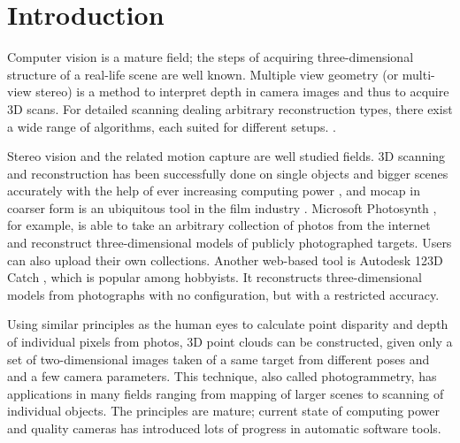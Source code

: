 \section{Introduction}
\thispagestyle{empty}

Computer vision is a mature field; the steps of acquiring three-dimensional structure of a real-life scene are well known.
Multiple view geometry (or multi-view stereo) is a method to interpret depth in camera images and thus to acquire 3D scans.
\cite{hartley03multiview,szeliski10vision,trucco1998introductory,heyden2005multiple}
For detailed scanning dealing arbitrary reconstruction types, there exist a wide range of algorithms, each suited for different setups.
\cite{seitz2006comparison}.

Stereo vision and the related motion capture are well studied fields.
3D scanning and reconstruction has been successfully done on single objects and bigger scenes accurately with the help of ever increasing computing power
\cite{goesele2007multi,furukawa2010towards,pollefeys1999hand},
and mocap in coarser form is an ubiquitous tool in the film industry \cite{moeslund2006survey}.
Microsoft Photosynth \cite{photosynth}, for example, is able to take an arbitrary collection of photos from the internet and reconstruct three-dimensional models of publicly photographed targets. Users can also upload their own collections.
Another web-based tool is Autodesk 123D Catch \cite{autodeskcatch}, which is popular among hobbyists. It reconstructs three-dimensional models from photographs with no configuration, but with a restricted accuracy.

Using similar principles as the human eyes to calculate point disparity and depth of individual pixels from photos, 3D point clouds can be constructed, given only a set of two-dimensional images taken of a same target from different poses and and a few camera parameters.
\cite{hartley03multiview}
This technique, also called photogrammetry, has applications in many fields ranging from mapping of larger scenes to scanning of individual objects.
The principles are mature; current state of computing power and quality cameras has introduced lots of progress in automatic software tools.


